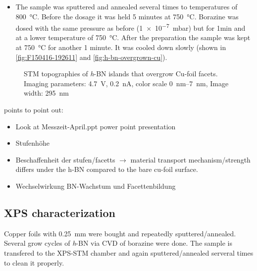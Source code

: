 	\begin{itemize}
		\item The sample was sputtered and annealed several times to temperatures of \SI{800}{\celsius}. Before the dosage it was held 5 minutes at \SI{750}{\celsius}. Borazine was dosed with the same pressure as before (\SI{1e-7}{\milli \bar}) but for 1min and at a lower temperature of \SI{750}{\celsius}. After the preparation the sample was kept at \SI{750}{\celsius} for another 1 minute. It was cooled down slowly (shown in \autoref{fig:F150416-192611} and \autoref{fig:h-bn-overgrown-cu}).
	\end{itemize} 
	\begin{figure}[h!]
		\centering
		 \quad %
		\caption{STM topographies of \textit{h}-BN islands that overgrow Cu-foil facets. Imaging parameters: 		
			\SI{4.7}{\volt}, \SI{0.2}{\nano\ampere}, color scale \SIrange{0}{7}{\nano\meter}, Image width: \SI{295}{\nano \meter}
		}%
		\label{fig:h-bn-overgrown-cu}
	\end{figure}
	points to point out:
	\begin{itemize}
		\item Look at Messzeit-April.ppt power point presentation
		\item Stufenh\"ohe
		\item Beschaffenheit der stufen/facetts $\rightarrow$ material transport mechanism/strength differs under the h-BN compared to the bare cu-foil surface.
		\item Wechselwirkung BN-Wachstum und Facettenbildung
	\end{itemize}
	
\subsection{XPS characterization}
Copper foils with \SI{0.25}{\mm} were bought and repeatedly sputtered/annealed. Several grow cycles of \textit{h}-BN via CVD of borazine were done.  The sample is transfered to the XPS-STM chamber and again sputtered/annealed serveral times to clean it properly.

